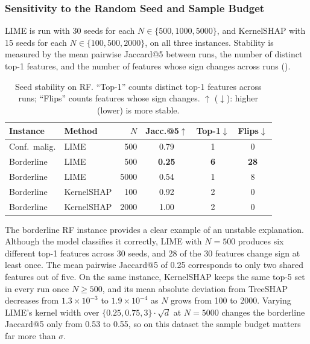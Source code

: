 \subsubsection{Sensitivity to the Random Seed and Sample Budget}
LIME is run with 30 seeds for each $N \in \{500, 1000, 5000\}$, and KernelSHAP with 15 seeds for each $N \in \{100, 500, 2000\}$, on all three instances. Stability is measured by the mean pairwise Jaccard@5 between runs, the number of distinct top-1 features, and the number of features whose sign changes across runs ().

\begin{table}[htbp]
    \centering
    \footnotesize
    \caption{Seed stability on RF. ``Top-1'' counts distinct top-1 features across runs; ``Flips'' counts features whose sign changes. $\uparrow$ ($\downarrow$): higher (lower) is more stable.}
    \label{tab:stability}
    \setlength{\tabcolsep}{4pt}
    \begin{tabular}{@{}llrccc@{}}
        \toprule
        Instance & Method & $N$ & Jacc.@5$\uparrow$ & Top-1$\downarrow$ & Flips$\downarrow$ \\
        \midrule
        Conf.\ malig. & LIME & 500 & 0.79 & 1 & 0 \\
        \midrule
        Borderline & LIME & 500 & \textbf{0.25} & \textbf{6} & \textbf{28} \\
        Borderline & LIME & 5000 & 0.54 & 1 & 8 \\
        Borderline & KernelSHAP & 100 & 0.92 & 2 & 0 \\
        Borderline & KernelSHAP & 2000 & 1.00 & 2 & 0 \\
        \bottomrule
    \end{tabular}
\end{table}

The borderline RF instance provides a clear example of an unstable explanation. Although the model classifies it correctly, LIME with $N = 500$ produces six different top-1 features across 30 seeds, and 28 of the 30 features change sign at least once. The mean pairwise Jaccard@5 of 0.25 corresponds to only two shared features out of five. On the same instance, KernelSHAP keeps the same top-5 set in every run once $N \ge 500$, and its mean absolute deviation from TreeSHAP decreases from $1.3 \times 10^{-3}$ to $1.9 \times 10^{-4}$ as $N$ grows from 100 to 2000. Varying LIME's kernel width over $\{0.25, 0.75, 3\} \cdot \sqrt{d}$ at $N = 5000$ changes the borderline Jaccard@5 only from 0.53 to 0.55, so on this dataset the sample budget matters far more than $\sigma$.

